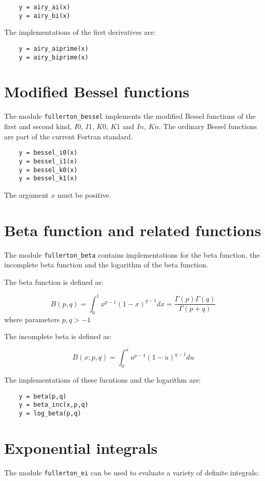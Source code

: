 \documentclass{article}
\begin{document}
\begin{verbatim}
    y = airy_ai(x)
    y = airy_bi(x)
\end{verbatim}

The implementations of the first derivatives are:

\begin{verbatim}
    y = airy_aiprime(x)
    y = airy_biprime(x)
\end{verbatim}


\section{Modified Bessel functions}
The module \verb+fullerton_bessel+ implements the modified Bessel functions of the first and second kind, $I0$, $I1$, $K0$, $K1$
and $In$, $Kn$. The ordinary Bessel functions are part of the current Fortran standard.

\begin{verbatim}
    y = bessel_i0(x)
    y = bessel_i1(x)
    y = bessel_k0(x)
    y = bessel_k1(x)
\end{verbatim}
The argument $x$ must be positive.

\section{Beta function and related functions}
The module \verb+fullerton_beta+ contains implementations for the beta function, the incomplete beta function
and the logarithm of the beta function.

The beta function is defined as:

\begin{equation}
    B(p,q) = \int_0^1 x^{p-1} (1 - x)^{q-1} dx = \frac{\Gamma(p)\Gamma(q)}{\Gamma(p+q)}
\end{equation}
\noindent where parameters $p, q > -1$

The incomplete beta is defined as:

\begin{equation}
    B(x;p,q) = \int_0^x u^{p-1} (1 - u)^{q-1} du
\end{equation}

The implementations of these fucntions and the logarithm are:

\begin{verbatim}
    y = beta(p,q)
    y = beta_inc(x,p,q)
    y = log_beta(p,q)
\end{verbatim}


\section{Exponential integrals}
The module \verb+fullerton_ei+ can be used to evaluate a variety of definite integrals:
\end{document}
